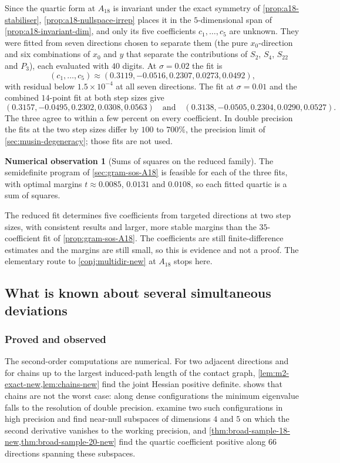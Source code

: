 \documentclass[11pt,reqno]{amsart}
\renewcommand{\_}{\origunderscore\allowbreak}
\numberwithin{equation}{section}
\theoremstyle{plain}
\theoremstyle{definition}
\newtheorem{numobs}[thm]{Numerical observation}
\theoremstyle{remark}
\begin{document}
Since the quartic form at $A_{18}$ is invariant under the exact
symmetry of \cref{prop:a18-stabiliser}, \cref{prop:a18-nullspace-irrep}
places it in the $5$-dimensional span of \cref{prop:a18-invariant-dim},
and only its five coefficients $c_1,\dots,c_5$ are unknown. They were
fitted from seven directions chosen to separate them (the pure
$x_0$-direction and six combinations of $x_0$ and $y$ that separate the
contributions of $S_2$, $S_4$, $S_{22}$ and $P_3$), each evaluated with
$40$ digits. At $\sigma=0.02$ the fit is
\[
  (c_1,\dots,c_5)\approx(0.3119,-0.0516,0.2307,0.0273,0.0492),
\]
with residual below $1.5\times10^{-4}$ at all seven directions. The fit
at $\sigma=0.01$ and the combined $14$-point fit at both step sizes give
\[
  (0.3157,-0.0495,0.2302,0.0308,0.0563)
  \quad\text{and}\quad
  (0.3138,-0.0505,0.2304,0.0290,0.0527).
\]
The three agree to within a few percent on every coefficient. In double
precision the fits at the two step sizes differ by $100$ to $700\%$, the
precision limit of \cref{sec:musin-degeneracy}; those fits are not used.

\begin{numobs}[Sums of squares on the reduced family]\label{prop:a18-sos-reduced}
The semidefinite program of \cref{sec:gram-sos-A18} is feasible for
each of the three fits, with optimal margins $t\approx0.0085$,
$0.0131$ and $0.0108$, so each fitted quartic is a sum of squares.
\end{numobs}

The reduced fit determines five coefficients from targeted directions
at two step sizes, with consistent results and larger, more stable
margins than the $35$-coefficient fit of \cref{prop:gram-sos-A18}. The
coefficients are still finite-difference estimates and the margins are
still small, so this is evidence and not a proof. The elementary route
to \cref{conj:multidir-new} at $A_{18}$ stops here.

\subsection{What is known about several simultaneous deviations}\label{sec:multidir-scope-summary}

\subsubsection{Proved and observed}

The second-order computations are numerical. For two adjacent
directions and for chains up to the largest induced-path length of the
contact graph, \cref{lem:m2-exact-new,lem:chains-new} find the joint
Hessian positive definite.  shows that
chains are not the worst case: along dense configurations the minimum
eigenvalue falls to the resolution of double precision.
examine two such configurations in high precision and find near-null
subspaces of dimensions $4$ and $5$ on which the second derivative
vanishes to the working precision, and
\cref{thm:broad-sample-18-new,thm:broad-sample-20-new} find the quartic
coefficient positive along $66$ directions spanning these subspaces.
\end{document}
